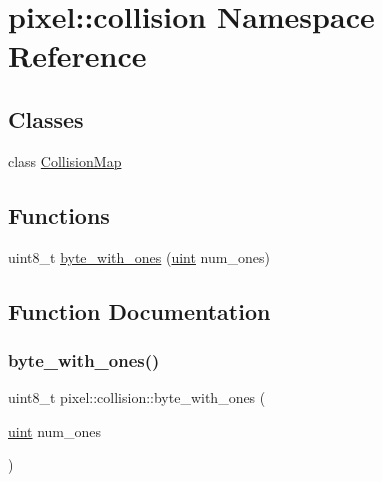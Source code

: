 \hypertarget{namespacepixel_1_1collision}{}\section{pixel\+:\+:collision Namespace Reference}
\label{namespacepixel_1_1collision}
\subsection*{Classes}
\begin{DoxyCompactItemize}
\item 
class \hyperlink{classpixel_1_1collision_1_1_collision_map}{Collision\+Map}
\end{DoxyCompactItemize}
\subsection*{Functions}
\begin{DoxyCompactItemize}
\item 
uint8\+\_\+t \hyperlink{namespacepixel_1_1collision_ad3309ad1b5113298ac2f2415196fe064}{byte\+\_\+with\+\_\+ones} (\hyperlink{namespacepixel_a6706355faabffaabebd430b2fa55843a}{uint} num\+\_\+ones)
\end{DoxyCompactItemize}


\subsection{Function Documentation}
\mbox{\label{namespacepixel_1_1collision_ad3309ad1b5113298ac2f2415196fe064}} 
\subsubsection{\texorpdfstring{byte\+\_\+with\+\_\+ones()}{byte\_with\_ones()}}
{\footnotesize\ttfamily uint8\+\_\+t pixel\+::collision\+::byte\+\_\+with\+\_\+ones (\begin{DoxyParamCaption}\item[{\hyperlink{namespacepixel_a6706355faabffaabebd430b2fa55843a}{uint}}]{num\+\_\+ones }\end{DoxyParamCaption})}

